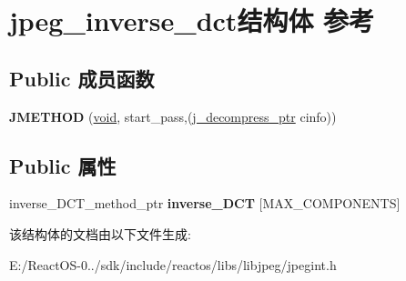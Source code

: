 \hypertarget{structjpeg__inverse__dct}{}\section{jpeg\+\_\+inverse\+\_\+dct结构体 参考}
\label{structjpeg__inverse__dct}
\subsection*{Public 成员函数}
\begin{DoxyCompactItemize}
\item 
\mbox{\label{structjpeg__inverse__dct_a2e9c37cdc48deba795ea5ede7834a3c0}} 
{\bfseries J\+M\+E\+T\+H\+OD} (\hyperlink{interfacevoid}{void}, start\+\_\+pass,(\hyperlink{structjpeg__decompress__struct}{j\+\_\+decompress\+\_\+ptr} cinfo))
\end{DoxyCompactItemize}
\subsection*{Public 属性}
\begin{DoxyCompactItemize}
\item 
\mbox{\label{structjpeg__inverse__dct_aa05e35a50f28daf199d2efa702a72c2a}} 
inverse\+\_\+\+D\+C\+T\+\_\+method\+\_\+ptr {\bfseries inverse\+\_\+\+D\+CT} \mbox{[}M\+A\+X\+\_\+\+C\+O\+M\+P\+O\+N\+E\+N\+TS\mbox{]}
\end{DoxyCompactItemize}


该结构体的文档由以下文件生成\+:\begin{DoxyCompactItemize}
\item 
E\+:/\+React\+O\+S-\/0../sdk/include/reactos/libs/libjpeg/jpegint.\+h\end{DoxyCompactItemize}
